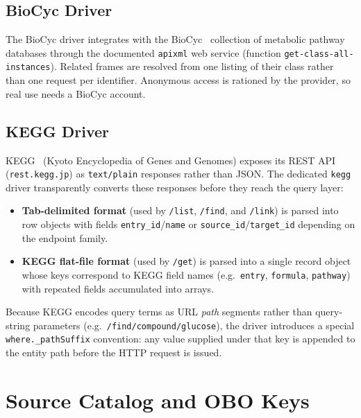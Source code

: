 \documentclass[sigconf,nonacm]{acmart}
\begin{document}
\subsection{BioCyc Driver}

The BioCyc driver integrates with the BioCyc~\cite{biocyc} collection
of metabolic pathway databases through the documented
\texttt{apixml} web service (function
\texttt{get-class-all-instances}).  Related frames
are resolved from one listing of their class rather than one request
per identifier.  Anonymous access is rationed by the provider, so real
use needs a BioCyc account.

\subsection{KEGG Driver}

KEGG~\cite{kegg} (Kyoto Encyclopedia of Genes and Genomes) exposes its
REST API (\texttt{rest.kegg.jp}) as \texttt{text/plain} responses rather
than JSON.  The dedicated \texttt{kegg} driver transparently converts
these responses before they reach the query layer:

\begin{itemize}
  \item \textbf{Tab-delimited format} (used by \texttt{/list},
        \texttt{/find}, and \texttt{/link}) is parsed into row objects
        with fields \texttt{entry\_id}/\texttt{name} or
        \texttt{source\_id}/\texttt{target\_id} depending on the
        endpoint family.
  \item \textbf{KEGG flat-file format} (used by \texttt{/get}) is parsed
        into a single record object whose keys correspond to KEGG
        field names (e.g.\ \texttt{entry}, \texttt{formula},
        \texttt{pathway}) with repeated fields accumulated into arrays.
\end{itemize}

Because KEGG encodes query terms as URL \emph{path} segments rather
than query-string parameters (e.g.\ \texttt{/find/compound/glucose}),
the driver introduces a special \texttt{where.\_pathSuffix} convention:
any value supplied under that key is appended to the entity path
before the HTTP request is issued.

\section{Source Catalog and OBO Keys}
\label{sec:catalog}
\end{document}
